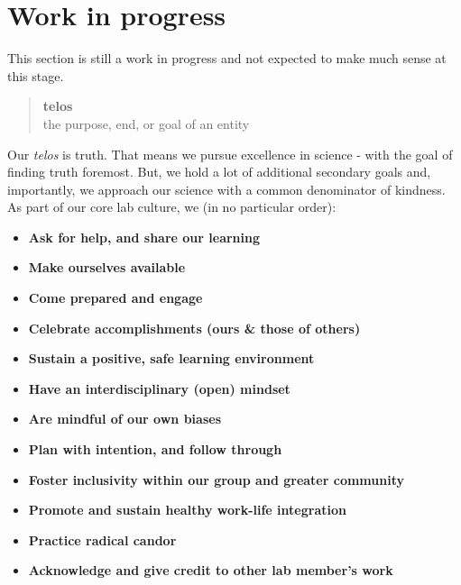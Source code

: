 \documentclass[
  letterpaper,
  DIV=11,
  numbers=noendperiod]{scrreprt}
\providecommand{\tightlist}{%
  \setlength{\itemsep}{0pt}\setlength{\parskip}{0pt}}\usepackage{longtable,booktabs,array}
\begin{document}
\begin{tcolorbox}[enhanced jigsaw, colframe=quarto-callout-caution-color-frame, opacityback=0, leftrule=.75mm, bottomrule=.15mm, rightrule=.15mm, left=2mm, toptitle=1mm, colback=white, bottomtitle=1mm, titlerule=0mm, title=\textcolor{quarto-callout-caution-color}{\faFire}\hspace{0.5em}{Danger}, arc=.35mm, toprule=.15mm, breakable, coltitle=black, colbacktitle=quarto-callout-caution-color!10!white, opacitybacktitle=0.6]


\hypertarget{work-in-progress}{%
\chapter{Work in progress}\label{work-in-progress}}

This section is still a work in progress and not expected to make much
sense at this stage.

\end{tcolorbox}

\begin{quote}
\textbf{telos}\\
the purpose, end, or goal of an entity
\end{quote}

Our \emph{telos} is truth. That means we pursue excellence in science -
with the goal of finding truth foremost. But, we hold a lot of
additional secondary goals and, importantly, we approach our science
with a common denominator of kindness. As part of our core lab culture,
we (in no particular order):

\begin{itemize}
\tightlist
\item
  \textbf{Ask for help, and share our learning}
\item
  \textbf{Make ourselves available}
\item
  \textbf{Come prepared and engage}
\item
  \textbf{Celebrate accomplishments (ours \& those of others)}
\item
  \textbf{Sustain a positive, safe learning environment}
\item
  \textbf{Have an interdisciplinary (open) mindset}
\item
  \textbf{Are mindful of our own biases}
\item
  \textbf{Plan with intention, and follow through}
\item
  \textbf{Foster inclusivity within our group and greater community}
\item
  \textbf{Promote and sustain healthy work-life integration}
\item
  \textbf{Practice radical candor}
\item
  \textbf{Acknowledge and give credit to other lab member's work}
\end{itemize}
\end{document}

